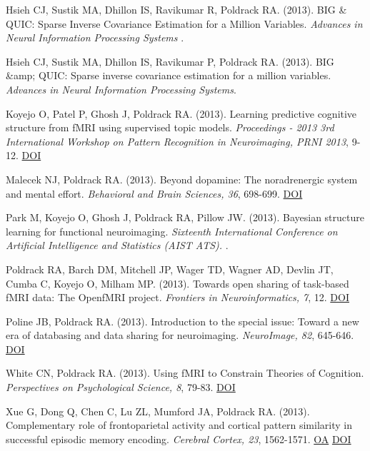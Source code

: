\documentclass[10pt, letterpaper]{article}
\begin{document}
Hsieh CJ, Sustik MA, Dhillon IS, Ravikumar R, Poldrack RA.  (2013). BIG \& QUIC: Sparse Inverse Covariance Estimation for a Million Variables. \textit{Advances in Neural Information Processing Systems }. \vspace{2mm}

Hsieh CJ, Sustik MA, Dhillon IS, Ravikumar P, Poldrack RA.  (2013). BIG \&amp; QUIC: Sparse inverse covariance estimation for a million variables. \textit{Advances in Neural Information Processing Systems}. \vspace{2mm}

Koyejo O, Patel P, Ghosh J, Poldrack RA.  (2013). Learning predictive cognitive structure from fMRI using supervised topic models. \textit{Proceedings - 2013 3rd International Workshop on Pattern Recognition in Neuroimaging, PRNI 2013}, 9-12. \href{https://doi.org/10.1109/prni.2013.12}{DOI} \vspace{2mm}

Malecek NJ, Poldrack RA.  (2013). Beyond dopamine: The noradrenergic system and mental effort. \textit{Behavioral and Brain Sciences, 36}, 698-699. \href{https://doi.org/10.1017/s0140525x13001106}{DOI} \vspace{2mm}

Park M, Koyejo O, Ghosh J, Poldrack RA, Pillow JW.  (2013). Bayesian structure learning for functional neuroimaging. \textit{Sixteenth International Conference on Artificial Intelligence and Statistics (AIST ATS). }. \vspace{2mm}

Poldrack RA, Barch DM, Mitchell JP, Wager TD, Wagner AD, Devlin JT, Cumba C, Koyejo O, Milham MP.  (2013). Towards open sharing of task-based fMRI data: The OpenfMRI project. \textit{Frontiers in Neuroinformatics, 7}, 12. \href{https://doi.org/10.3389/fninf.2013.00012}{DOI} \vspace{2mm}

Poline JB, Poldrack RA.  (2013). Introduction to the special issue: Toward a new era of databasing and data sharing for neuroimaging. \textit{NeuroImage, 82}, 645-646. \href{https://doi.org/10.1016/j.neuroimage.2013.08.044}{DOI} \vspace{2mm}

White CN, Poldrack RA.  (2013). Using fMRI to Constrain Theories of Cognition. \textit{Perspectives on Psychological Science, 8}, 79-83. \href{https://doi.org/10.1177/1745691612469029}{DOI} \vspace{2mm}

Xue G, Dong Q, Chen C, Lu ZL, Mumford JA, Poldrack RA.  (2013). Complementary role of frontoparietal activity and cortical pattern similarity in successful episodic memory encoding. \textit{Cerebral Cortex, 23}, 1562-1571. \href{https://www.ncbi.nlm.nih.gov/pmc/articles/PMC3726068}{OA} \href{https://doi.org/10.1093/cercor/bhs143}{DOI} \vspace{2mm}
\end{document}
